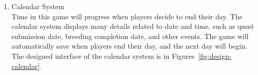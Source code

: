 \documentclass[12pt,oneside,openright,a4paper]{cpe-english-project}
\begin{document}
\begin{itemize}
\begin{enumerate}
	\begin{minipage}[c]{\textwidth}\centering
	\label{fig:design-shop-monster}
	\end{minipage}

	\item Calendar System \\
	Time in this game will progress when players decide to end their day. The calendar system displays many details related to date and time, such as quest submission date, breeding completion date, and other events. The game will automatically save when players end their day, and the next day will begin. The designed interface of the calendar system is in Figures~\ref{fig:design-calendar}. \\
	\begin{minipage}[c]{\textwidth}\centering
	\label{fig:design-calendar}
	\end{minipage}
\end{enumerate}

\end{itemize}
\end{document}
